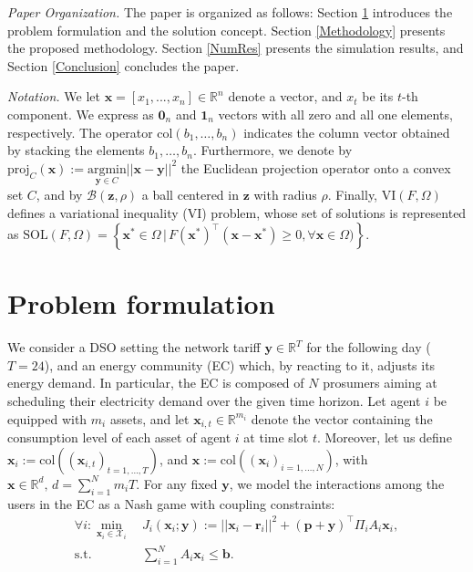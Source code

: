 \documentclass[letterpaper, 10 pt, conference]{ieeeconf}
\newcommand{\real}{\mathbb{R}}
\newcommand\bbf{\mathbf{b}}
\newcommand\pbf{\mathbf{p}}
\newcommand\rbf{\mathbf{r}}
\newcommand\xbf{\mathbf{x}}
\newcommand\ybf{\mathbf{y}}
\newcommand\zbf{\mathbf{z}}
\begin{document}
\smallskip
\noindent
\emph{Paper Organization.}
The paper is organized as follows: Section \ref{Formulation} introduces the problem formulation and the solution concept. Section \ref{Methodology} presents the proposed methodology. Section \ref{NumRes} presents the simulation results, and Section \ref{Conclusion} concludes the paper.

\smallskip
\noindent
\emph{Notation.}
We let $\xbf=[x_1, ... , x_n] \in \real^n$ denote a vector, and $x_t$ be its $t$-th component. We express as $\boldsymbol{0}_n$ and $ \mathbf{1}_n$ vectors with all zero and all one elements, respectively. The operator $\mathrm{col}(b_1,\dots,b_n)$ indicates the column vector obtained by stacking the elements $b_1,\dots,b_n$. Furthermore, we denote by $\mathrm{proj}_C(\xbf):= \underset{{ \ybf \in C }}{\mathrm{argmin}} ||\xbf - \ybf||^2 $ the Euclidean projection operator onto a convex set $C$, and by $\mathcal{B}(\zbf, \rho)$ a ball centered in $\zbf$ with radius $\rho$. Finally, $\mathrm{VI}(F,\Omega)$ defines a variational inequality (VI) problem, whose set of solutions is represented as $\mathrm{SOL}(F,\Omega)=\left\{\xbf^* \in \Omega\,|\,F(\xbf^*)^\top(\xbf-\xbf^*)\ge0, \forall \xbf \in \Omega)\right\}$.
\section{Problem formulation}\label{Formulation}
We consider a DSO setting the network
tariff $\ybf \in \real^T$ for the following day ($T=24$), and an energy community (EC) which, by reacting to it, adjusts its energy demand.
In particular, the EC is composed of $N$ prosumers aiming at scheduling their electricity demand over the given time horizon. Let agent $i$ be equipped with $m_i$ assets, and let $\xbf_{i,t} \in \real^{m_i}$ denote the vector containing the consumption level of each asset of agent $i$ at time slot $t$. Moreover, let us define $\xbf_i:=\mathrm{col}((\xbf_{i,t})_{t=1,\dots,T})$, and $\xbf:=\mathrm{col}((\xbf_{i})_{i=1,\dots,N})$, with $\xbf \in \real^d, \,d=\sum_{i=1}^Nm_i T$. For any fixed $\ybf$, we model the interactions among the users in the EC as a Nash game with coupling constraints:
\begin{subequations}\label{Followers}
\begin{align}
\forall i: \underset{\xbf_i \in \mathcal{X}_i} {\min} \, &J_i(\xbf_i; \ybf):=||\xbf_i - \rbf_i||^2 + (\pbf+\ybf)^\top \Pi_i A_i \xbf_i, \label{FollowersObj}
\\
\mathrm{s.t.}\, \, &\sum_{i=1}^N A_i\xbf_i \le \bbf. \label{FollowersConstr}
\end{align}
\end{subequations} 
\end{document}
